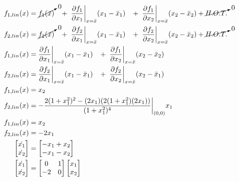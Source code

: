 \documentclass{article}
\begin{document}
  \begin{align*}
    f_{1, lin}(x) &= \cancelto{0}{f_1(\bar{x})} \hspace{3.0mm} + \hspace{1.0mm}
    \frac{\partial f_1}{\partial x_1}\bigg|_{x=\bar{x}}(x_1-\bar{x}_1) \hspace{3.0mm} + \hspace{1.0mm}
    \frac{\partial f_1}{\partial x_2}\bigg|_{x=\bar{x}}(x_2-\bar{x}_2)+ \cancelto{0}{H.O.T.} \\ 
    f_{2, lin}(x) &= \cancelto{0}{f_2(\bar{x})} \hspace{3.0mm} + \hspace{1.0mm}
    \frac{\partial f_2}{\partial x_1}\bigg|_{x=\bar{x}}(x_1-\bar{x}_1) \hspace{3.0mm} + \hspace{1.0mm}
    \frac{\partial f_2}{\partial x_2}\bigg|_{x=\bar{x}}(x_2-\bar{x}_2)+ \cancelto{0}{H.O.T.} \\
    f_{1, lin}(x) &= \frac{\partial f_1}{\partial x_1}\bigg|_{x=\bar{x}}(x_1-\bar{x}_1) \hspace{3.0mm} + \hspace{1.0mm}
    \frac{\partial f_1}{\partial x_2}\bigg|_{x=\bar{x}}(x_2-\bar{x}_2) \\ 
    f_{2, lin}(x) &= \frac{\partial f_2}{\partial x_1}\bigg|_{x=\bar{x}}(x_1-\bar{x}_1) \hspace{3.0mm} + \hspace{1.0mm}
    \frac{\partial f_2}{\partial x_2}\bigg|_{x=\bar{x}}(x_2-\bar{x}_1) \\     
    f_{1, lin}(x) &= x_2 \\
    f_{2, lin}(x) &= -\frac{2(1+x_1^2)^2 - (2x_1)(2(1+x_1^2)(2x_1))}{(1+x_1^2)^4}\bigg|_{(0,0)}x_1 \\
    f_{1, lin}(x) &= x_2 \\
    f_{2, lin}(x) &= -2x_1 \\
    \begin{bmatrix}
      \dot{x_1} \\
      \dot{x_2}
    \end{bmatrix} &=
    \begin{bmatrix}
      -x_1 + x_2 \\
      -x_1 - x_2
    \end{bmatrix} \\
    \begin{bmatrix}
      \dot{x_1} \\
      \dot{x_2}
    \end{bmatrix} &=
    \begin{bmatrix}
     0 & 1 \\
     -2 & 0
    \end{bmatrix} 
    \begin{bmatrix}
      x_1 \\
      x_2
    \end{bmatrix} 
   \end{align*}
\end{document}
